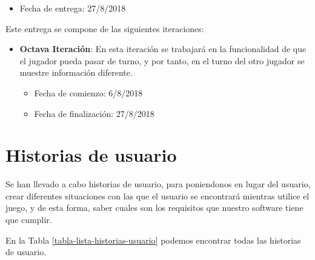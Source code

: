 \begin{itemize}
  \item Fecha de entrega: 27/8/2018
\end{itemize}

\hfill

Este entrega se compone de las siguientes iteraciones:

\begin{itemize}
  \item \textbf{Octava Iteración}:  En esta iteración se trabajará en la funcionalidad de que el jugador pueda pasar de turno, y por tanto, en el turno del otro jugador se muestre información diferente.

  \begin{itemize}
    \item Fecha de comienzo: 6/8/2018
    \item Fecha de finalización: 27/8/2018
  \end{itemize}
\end{itemize}


\section{Historias de usuario}
Se han llevado a cabo historias de usuario, para poniendonos en lugar del usuario, crear diferentes situaciones con las que el usuario se encontrará mientras utilice el juego, y de esta forma, saber cuales son los requisitos que nuestro software tiene que cumplir.

En la Tabla \ref{tabla-lista-historias-usuario} podemos encontrar todas las historias de usuario.


